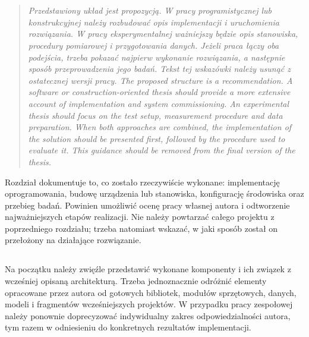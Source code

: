 \chapter{}


\begin{quote}
\itshape
\ploren
  {Przedstawiony układ jest propozycją. W pracy programistycznej lub konstrukcyjnej należy rozbudować opis implementacji i uruchomienia rozwiązania. W pracy eksperymentalnej ważniejszy będzie opis stanowiska, procedury pomiarowej i przygotowania danych. Jeżeli praca łączy oba podejścia, trzeba pokazać najpierw wykonanie rozwiązania, a następnie sposób przeprowadzenia jego badań. Tekst tej wskazówki należy usunąć z ostatecznej wersji pracy.}
  {The proposed structure is a recommendation. A software or construction-oriented thesis should provide a more extensive account of implementation and system commissioning. An experimental thesis should focus on the test setup, measurement procedure and data preparation. When both approaches are combined, the implementation of the solution should be presented first, followed by the procedure used to evaluate it. This guidance should be removed from the final version of the thesis.}
\end{quote}

Rozdział dokumentuje to, co zostało rzeczywiście wykonane: implementację oprogramowania, budowę urządzenia lub stanowiska, konfigurację środowiska oraz przebieg badań. Powinien umożliwić ocenę pracy własnej autora i odtworzenie najważniejszych etapów realizacji. Nie należy powtarzać całego projektu z poprzedniego rozdziału; trzeba natomiast wskazać, w jaki sposób został on przełożony na działające rozwiązanie.

\section{}

Na początku należy zwięźle przedstawić wykonane komponenty i ich związek z wcześniej opisaną architekturą. Trzeba jednoznacznie odróżnić elementy opracowane przez autora od gotowych bibliotek, modułów sprzętowych, danych, modeli i fragmentów wcześniejszych projektów. W przypadku pracy zespołowej należy ponownie doprecyzować indywidualny zakres odpowiedzialności autora, tym razem w odniesieniu do konkretnych rezultatów implementacji.

